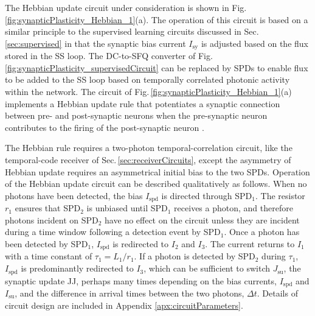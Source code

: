 \documentclass[aip,amsmath,amssymb,reprint,nofootinbib]{revtex4-1}
\begin{document}
The Hebbian update circuit under consideration is shown in Fig. \ref{fig:synapticPlasticity_Hebbian_1}(a). The operation of this circuit is based on a similar principle to the supervised learning circuits discussed in Sec.\,\ref{sec:supervised} in that the synaptic bias current $I_{\mathrm{sy}}$ is adjusted based on the flux stored in the SS loop. The DC-to-SFQ converter of Fig.\,\ref{fig:synapticPlasticity_supervisedCircuit} can be replaced by SPDs to enable flux to be added to the SS loop based on temporally correlated photonic activity within the network. The circuit of Fig.\,\ref{fig:synapticPlasticity_Hebbian_1}(a) implements a Hebbian update rule that potentiates a synaptic connection between pre- and post-synaptic neurons when the pre-synaptic neuron contributes to the firing of the post-synaptic neuron \cite{daab2001}. 

The Hebbian rule requires a two-photon temporal-correlation circuit, like the temporal-code receiver of Sec.\,\ref{sec:receiverCircuits}, except the asymmetry of Hebbian update requires an asymmetrical initial bias to the two SPDs. Operation of the Hebbian update circuit can be described qualitatively as follows. When no photons have been detected, the bias $I_{\mathrm{spd}}$ is directed through SPD$_1$. The resistor $r_1$ ensures that SPD$_2$ is unbiased until SPD$_1$ receives a photon, and therefore photons incident on SPD$_2$ have no effect on the circuit unless they are incident during a time window following a detection event by SPD$_1$. Once a photon has been detected by SPD$_1$, $I_{\mathrm{spd}}$ is redirected to $I_2$ and $I_3$. The current returns to $I_1$ with a time constant of $\tau_1 = L_1/r_1$. If a photon is detected by SPD$_2$ during $\tau_1$, $I_{\mathrm{spd}}$ is predominantly redirected to $I_3$, which can be sufficient to switch $J_{\mathrm{su}}$, the synaptic update JJ, perhaps many times depending on the bias currents, $I_{\mathrm{spd}}$ and $I_{\mathrm{su}}$, and the difference in arrival times between the two photons, $\Delta t$. Details of circuit design are included in Appendix \ref{apx:circuitParameters}.
\end{document}
